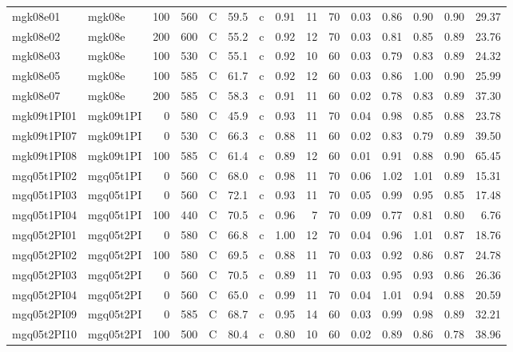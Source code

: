 \documentclass{article}
\begin{document}
\begin{landscape}
\begin{longtable}{llrrlrlrrrrrrrr}
    mgk08e01 &     mgk08e &  100 &  560 &     C &    59.5 &   c &  0.91 &  11 &         70 &  0.03 &  0.86 &  0.90 &  0.90 &   29.37 \\
    mgk08e02 &     mgk08e &  200 &  600 &     C &    55.2 &   c &  0.92 &  12 &         70 &  0.03 &  0.81 &  0.85 &  0.89 &   23.76 \\
    mgk08e03 &     mgk08e &  100 &  530 &     C &    55.1 &   c &  0.92 &  10 &         60 &  0.03 &  0.79 &  0.83 &  0.89 &   24.32 \\
    mgk08e05 &     mgk08e &  100 &  585 &     C &    61.7 &   c &  0.92 &  12 &         60 &  0.03 &  0.86 &  1.00 &  0.90 &   25.99 \\
    mgk08e07 &     mgk08e &  200 &  585 &     C &    58.3 &   c &  0.91 &  11 &         60 &  0.02 &  0.78 &  0.83 &  0.89 &   37.30 \\
 mgk09t1PI01 &  mgk09t1PI &    0 &  580 &     C &    45.9 &   c &  0.93 &  11 &         70 &  0.04 &  0.98 &  0.85 &  0.88 &   23.78 \\
 mgk09t1PI07 &  mgk09t1PI &    0 &  530 &     C &    66.3 &   c &  0.88 &  11 &         60 &  0.02 &  0.83 &  0.79 &  0.89 &   39.50 \\
 mgk09t1PI08 &  mgk09t1PI &  100 &  585 &     C &    61.4 &   c &  0.89 &  12 &         60 &  0.01 &  0.91 &  0.88 &  0.90 &   65.45 \\
 mgq05t1PI02 &  mgq05t1PI &    0 &  560 &     C &    68.0 &   c &  0.98 &  11 &         70 &  0.06 &  1.02 &  1.01 &  0.89 &   15.31 \\
 mgq05t1PI03 &  mgq05t1PI &    0 &  560 &     C &    72.1 &   c &  0.93 &  11 &         70 &  0.05 &  0.99 &  0.95 &  0.85 &   17.48 \\
 mgq05t1PI04 &  mgq05t1PI &  100 &  440 &     C &    70.5 &   c &  0.96 &   7 &         70 &  0.09 &  0.77 &  0.81 &  0.80 &    6.76 \\
 mgq05t2PI01 &  mgq05t2PI &    0 &  580 &     C &    66.8 &   c &  1.00 &  12 &         70 &  0.04 &  0.96 &  1.01 &  0.87 &   18.76 \\
 mgq05t2PI02 &  mgq05t2PI &  100 &  580 &     C &    69.5 &   c &  0.88 &  11 &         70 &  0.03 &  0.92 &  0.86 &  0.87 &   24.78 \\
 mgq05t2PI03 &  mgq05t2PI &    0 &  560 &     C &    70.5 &   c &  0.89 &  11 &         70 &  0.03 &  0.95 &  0.93 &  0.86 &   26.36 \\
 mgq05t2PI04 &  mgq05t2PI &    0 &  560 &     C &    65.0 &   c &  0.99 &  11 &         70 &  0.04 &  1.01 &  0.94 &  0.88 &   20.59 \\
 mgq05t2PI09 &  mgq05t2PI &    0 &  585 &     C &    68.7 &   c &  0.95 &  14 &         60 &  0.03 &  0.99 &  0.98 &  0.89 &   32.21 \\
 mgq05t2PI10 &  mgq05t2PI &  100 &  500 &     C &    80.4 &   c &  0.80 &  10 &         60 &  0.02 &  0.89 &  0.86 &  0.78 &   38.96 \\
\end{longtable}
\end{landscape}
\end{document}
